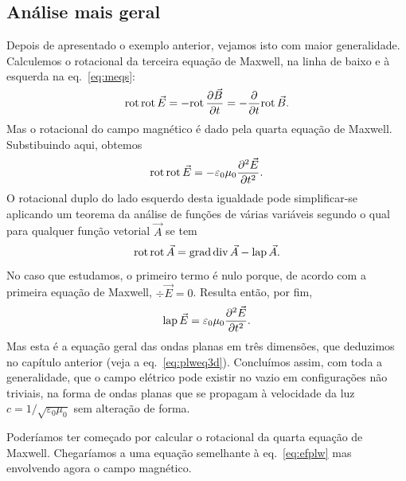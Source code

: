 \subsection*{Análise mais geral}
Depois de apresentado o exemplo anterior, vejamos isto com maior generalidade.
Calculemos o rotacional da terceira equação de Maxwell, na linha de baixo e à
esquerda na eq.~\eqref{eq:meqs}:
\begin{equation*}
  \rot\rot\vec E=-\rot\pd{\vec B}{t}=-\pd{}{t}\rot\vec B.
\end{equation*}
Mas o rotacional do campo magnético é dado pela quarta equação de Maxwell.
Substibuindo aqui, obtemos
\begin{equation*}
  \rot\rot\vec E=-\varepsilon_0\mu_0\pdd{\vec E}{t}.
\end{equation*}
O rotacional duplo do lado esquerdo desta igualdade pode simplificar-se
aplicando um teorema da análise de funções de várias variáveis segundo o qual
para qualquer função vetorial $\vec A$ se tem
\begin{equation*}
  \rot\rot\vec A=\grad\div\vec A - \lap\vec A.
\end{equation*}
No caso que estudamos, o primeiro termo é nulo porque, de acordo com a primeira
equação de Maxwell, $\div \vec E=0$. Resulta então, por fim,
\begin{equation}\label{eq:efplw}
  \lap\vec E=\varepsilon_0\mu_0\pdd{\vec E}{t}.
\end{equation}
Mas esta é a equação geral das ondas planas em três dimensões, que deduzimos no
capítulo anterior (veja a eq.~\eqref{eq:plweq3d}). Concluímos assim, com toda a
generalidade, que o campo elétrico pode existir no vazio em configurações não
triviais, na forma de ondas planas que se propagam à velocidade da luz
$c=1/\sqrt{\varepsilon_0\mu_0}$ sem alteração de forma.

Poderíamos ter começado por calcular o rotacional da quarta equação de Maxwell.
Chegaríamos a uma equação semelhante à eq.~\eqref{eq:efplw} mas envolvendo agora
o campo magnético.

